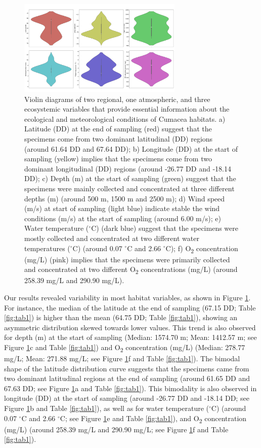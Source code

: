 {\begin{figure}[htbp]
    \centering
    \includegraphics[width=0.7\textwidth]{figure1.jpg}
    \caption{Violin diagrams of two regional, one atmospheric, and three ecosystemic variables that provide essential information about the ecological and meteorological conditions of Cumacea habitats. a) Latitude (DD) at the end of sampling (red) suggest that the specimens come from two dominant latitudinal (DD) regions (around 61.64 DD and 67.64 DD); b) Longitude (DD) at the start of sampling (yellow) implies that the specimens come from two dominant longitudinal (DD) regions (around -26.77 DD and -18.14 DD); c) Depth (m) at the start of sampling (green) suggest that the specimens were mainly collected and concentrated at three different depths (m) (around 500 m, 1500 m and 2500 m); d) Wind speed (m/s) at start of sampling (light blue) indicate stable the wind conditions (m/s) at the start of sampling (around 6.00 m/s); e) Water temperature ($^\circ$C) (dark blue) suggest that the specimens were mostly collected and concentrated at two different water temperatures ($^\circ$C) (around 0.07 $^\circ$C and 2.66 $^\circ$C); f) O\textsubscript{2} concentration (mg/L) (pink) implies that the specimens were primarily collected and concentrated at two different O\textsubscript{2} concentrations (mg/L) (around 258.39 mg/L and 290.90 mg/L). \label{fig:fig3}}
\end{figure}

Our results revealed variability in most habitat variables, as shown in Figure \ref{fig:fig3}. For instance, the median of the latitude at the end of sampling (67.15 DD; Table \ref{fig:tab1}) is higher than the mean (64.75 DD; Table \ref{fig:tab1}), showing an asymmetric distribution skewed towards lower values. This trend is also observed for depth (m) at the start of sampling (Median: 1574.70 m; Mean: 1412.57 m; see Figure \ref{fig:fig3}c and Table \ref{fig:tab1}) and O\textsubscript{2} concentration (mg/L) (Median: 278.77 mg/L; Mean: 271.88 mg/L; see Figure \ref{fig:fig3}f and Table \ref{fig:tab1}). The bimodal shape of the latitude distribution curve suggests that the specimens came from two dominant latitudinal regions at the end of sampling (around 61.65 DD and 67.63 DD; see Figure \ref{fig:fig3}a and Table \ref{fig:tab1}). This bimodality is also observed in longitude (DD) at the start of sampling (around -26.77 DD and -18.14 DD; see Figure \ref{fig:fig3}b and Table \ref{fig:tab1}), as well as for water temperature ($^\circ$C) (around 0.07 $^\circ$C and 2.66 $^\circ$C; see Figure \ref{fig:fig3}e and Table \ref{fig:tab1}), and O\textsubscript{2} concentration (mg/L) (around 258.39 mg/L and 290.90 mg/L; see Figure \ref{fig:fig3}f and Table \ref{fig:tab1}).

}
